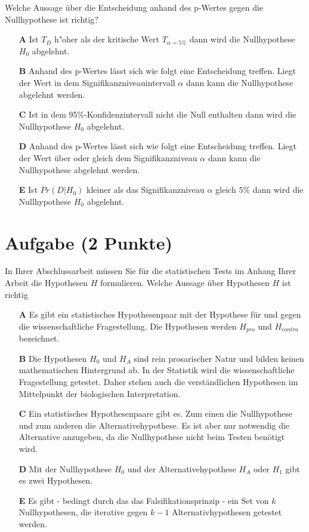 \documentclass[a4paper, 9pt]{scrartcl}\usepackage[]{graphicx}\usepackage[]{xcolor}
\begin{document}
Welche Aussage über die Entscheidung anhand des p-Wertes gegen die
Nullhypothese ist richtig?



\begin{enumerate}
\item [\textbf{A} \msquare] Ist $T_{D}$ h{"o}her als der kritische Wert $T_{\alpha = 5\%}$ dann wird die Nullhypothese $H_0$ abgelehnt.
\item [\textbf{B} \msquare] Anhand des p-Wertes lässt sich wie folgt eine Entscheidung treffen. Liegt der Wert in dem Signifikanzniveauintervall $\alpha$ dann kann die Nullhypothese abgelehnt werden.
\item [\textbf{C} \msquare] Ist in dem 95\%-Konfidenzintervall nicht die Null enthalten dann wird die Nullhypothese $H_0$ abgelehnt.
\item [\textbf{D} \msquare] Anhand des p-Wertes lässt sich wie folgt eine Entscheidung treffen. Liegt der Wert über oder gleich dem Signifikanzniveau $\alpha$ dann kann die Nullhypothese abgelehnt werden.
\item [\textbf{E} \msquare] Ist $Pr(D|H_0)$ kleiner als das Signifikanzniveau $\alpha$ gleich $5\%$ dann wird die Nullhypothese $H_0$ abgelehnt.
\end{enumerate}

\section{Aufgabe \hfill (2 Punkte)}



In Ihrer Abschlussarbeit müssen Sie für die statistischen Tests im Anhang Ihrer Arbeit die Hypothesen $H$ formulieren. Welche Aussage über Hypothesen $H$ ist richtig



\begin{enumerate}
\item [\textbf{A} \msquare] Es gibt ein statistisches Hypothesenpaar mit der Hypothese für und gegen die wissenschaftliche Fragestellung. Die Hypothesen werden $H_{pro}$ und $H_{contra}$ bezeichnet.
\item [\textbf{B} \msquare] Die Hypothesen $H_0$ und $H_A$ sind rein prosarischer Natur und bilden keinen mathematischen Hintergrund ab. In der Statistik wird die wissenschaftliche Fragestellung getestet. Daher stehen auch die verständlichen Hypothesen im Mittelpunkt der biologischen Interpretation.
\item [\textbf{C} \msquare] Ein statistisches Hypothesenpaare gibt es. Zum einen die Nullhypothese und zum anderen die Alternativehypothese. Es ist aber nur notwendig die Alternative anzugeben, da die Nullhypothese nicht beim Testen benötigt wird.
\item [\textbf{D} \msquare] Mit der Nullhypothese $H_0$ und der Alternativehypothese $H_A$ oder $H_1$ gibt es zwei Hypothesen.
\item [\textbf{E} \msquare] Es gibt - bedingt durch das das Falsifikationsprinzip - ein Set von $k$ Nullhypothesen, die iterative gegen $k-1$ Alternativhypothesen getestet werden.
\end{enumerate}
\end{document}
